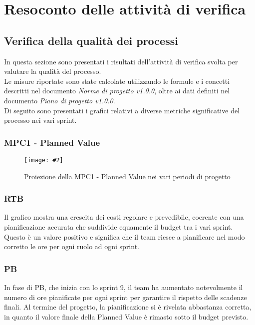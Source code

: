 \newcommand{\Met}[4]{
    \subsubsection{#1}
    \begin{figure}[h!] \centering
        \texttt{[image: \#2]}
        \caption{Proiezione della#1nei vari periodi di progetto}
    \end{figure}
    \subsubsection*{RTB}
    #3
    \subsubsection*{PB}
    #4
    \newpage
}

\newcommand{\MetNoPB}[3]{
    \subsubsection{#1}
    \begin{figure}[h!] \centering
        \texttt{[image: \#2]}
        \caption{Proiezione della#1negli ultimi periodi di progetto}
    \end{figure}
    \subsubsection*{PB}
    #3
    \newpage
}

\section{Resoconto delle attività di verifica}

\subsection{Verifica della qualità dei processi}
In questa sezione sono presentati i risultati dell'attività di verifica svolta per valutare la qualità del processo.\\
Le misure riportate sono state calcolate utilizzando le formule e i concetti descritti nel documento \textit{Norme di progetto v1.0.0}, oltre ai dati definiti nel documento \textit{Piano di progetto v1.0.0}.\\
Di seguito sono presentati i grafici relativi a diverse metriche significative del processo nei vari sprint.

\Met
{ %
    MPC1 - Planned Value
}
{ %
    template/images/PV.png
}
{ %
    Il grafico mostra una crescita dei costi regolare e prevedibile, coerente con una pianificazione accurata che suddivide equamente il budget tra i vari sprint.
    Questo è un valore positivo e significa che il team riesce a pianificare nel modo corretto le ore per ogni ruolo ad ogni sprint.
}
{ %
    In fase di PB, che inizia con lo sprint 9, il team ha aumentato notevolmente il numero di ore pianificate per ogni sprint per garantire il rispetto delle scadenze finali. 
    Al termine del progetto, la pianificazione si è rivelata abbastanza corretta, in quanto il valore finale della Planned Value è rimasto sotto il budget previsto.
}

